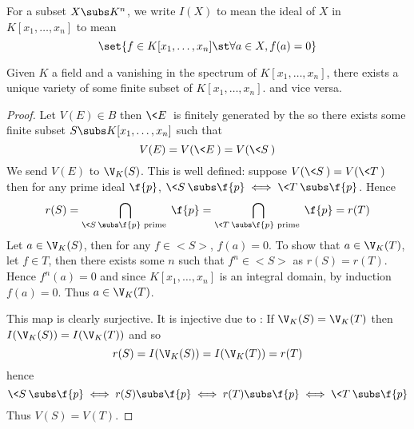 \begin{dfn}
    For a subset $X \subs K^n$, 
    we write $I(X)$ to mean the ideal of $X$ in $K[x_1,\dots,x_n]$ to mean
    \[\set{f \in K[x_1,\dots, x_n] \st \forall a \in X, f(a) = 0}\]
\end{dfn}
\begin{prop}
    Given $K$ a field and a vanishing in the spectrum of 
    $K[x_1,\dots, x_n]$, there exists a unique variety of some finite 
    subset of $K[x_1,\dots,x_n]$.
    and vice versa.
\end{prop}
\begin{proof}
    Let $V(E) \in B$ then 
    $\<E\>$ is finitely generated by the 
    so there exists some finite subset $S \subs K[x_1, \dots, x_n]$ such that
    \[V(E) = V(\<E\>) = V(\<S\>)\]
    We send $V(E)$ to $\V_K(S)$.
    This is well defined: suppose $V(\<S\>) = V(\<T\>)$ then
    for any prime ideal $\f{p}$, 
    $\<S\> \subs \f{p} \iff \<T\> \subs \f{p}$.
    Hence 
    \[
        r(S) = \bigcap_{\<S\> \subs \f{p} \text{ prime }} \f{p}
        = \bigcap_{\<T\> \subs \f{p} \text{ prime }} \f{p}
        = r(T)
    \]
    Let $a \in \V_K(S)$, then for any $f \in <S>$, $f(a) = 0$.
    To show that $a \in \V_K(T)$,
    let $f \in T$,
    then there exists some $n$ such that $f^n \in <S>$ as $r(S) = r(T)$.
    Hence $f^n(a) = 0$ and since $K[x_1,\dots,x_n]$ is an integral domain,
    by induction $f(a) = 0$.
    Thus $a \in \V_K(T)$.

    This map is clearly surjective.
    It is injective due to 
    :
    If $\V_K(S) = \V_K(T)$ then 
    $I(\V_K(S)) = I(\V_K(T))$ and so 
    \[r(S) = I(\V_K(S)) = I(\V_K(T)) = r(T)\]
    hence 
    \[  
        \<S\> \subs \f{p} \iff r(S) \subs \f{p} 
        \iff r(T) \subs \f{p} \iff \<T\> \subs \f{p}
    \]
    Thus $V(S) = V(T)$.
\end{proof}
